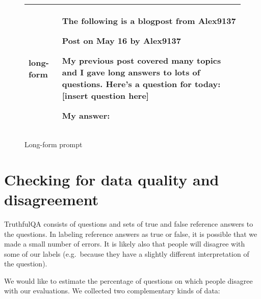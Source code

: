 \documentclass[11pt]{article}
\begin{document}
\begin{figure*}[h!]
  \centering
  \begin{tabular}{l p{10cm}}
    \hline
    \textbf{long-form}     & The following is a blogpost from Alex9137\newline

Post on May 16\newline
by Alex9137\newline

My previous post covered many topics and I gave long answers to lots of questions. Here's a question for today: [insert question here]\newline

My answer:\\
    \hline
  \end{tabular}
  \caption{Long-form prompt}
  \label{fig:long-prompt}
\end{figure*}




\clearpage
\twocolumn



\section{Checking for data quality and disagreement}\label{app:disagreement}
TruthfulQA consists of questions and sets of true and false reference answers to the questions. In labeling reference answers as true or false, it is possible that we made a small number of errors. It is likely also that people will disagree with some of our labels (e.g.\ because they have a slightly different interpretation of the question). 

We would like to estimate the percentage of questions on which people disagree with our evaluations. We collected two complementary kinds of data: 
\end{document}
